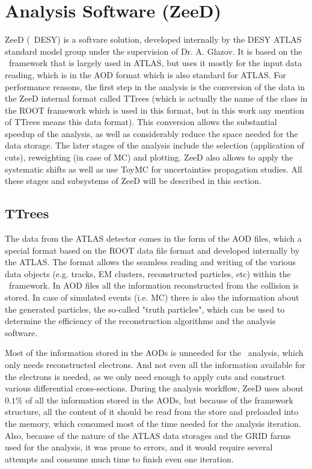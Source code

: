 \chapter{Analysis Software (ZeeD)}
\label{sec:ZeeD}
ZeeD (\Zee\ DESY) is a softvare solution, developed internally by the DESY ATLAS standard model group under the supervision of Dr. A. Glazov. It is based on the \Athena\ framework that is largely used in ATLAS, but uses it mostly for the input data reading, which is in the AOD format which is also standard for ATLAS. For performance reasons, the first step in the analysis is the conversion of the data in the ZeeD internal format called TTrees (which is actually the name of the class in the ROOT framework which is used in this format, but in this work any mention of TTrees means this data format). This conversion allows the substantial speedup of the analysis, as well as considerably reduce the space needed for the data storage. The later stages of the analysis include the selection (application of cuts), reweighting (in case of MC) and plotting. ZeeD also allows to apply the systematic shifts as well as use ToyMC for uncertainties propagation studies. All these stages and subsystems of ZeeD will be described in this section.

\section{TTrees}
\label{sec:ZeeD_TTrees}

The data from the ATLAS detector comes in the form of the AOD files, which a special format based on the ROOT data file format and developed internally by the ATLAS. The format allows the seamless reading and writing of the various data objects (e.g. tracks, EM clusters, reconstructed particles, etc) within the \Athena\ framework. In AOD files all the information reconstructed from the collision is stored. In case of simulated events (i.e. MC) there is also the information about the generated particles, the so-called "truth particles", which can be used to determine the efficiency of the reconstruction algorithms and the analysis software.

Most of the information stored in the AODs is unneeded for the \Zee\ analysis, which only needs reconstructed electrons. And not even all the information available for the electrons is needed, as we only need enough to apply cuts and construct various differential cross-sections. During the analysis workflow, ZeeD uses about $0.1\%$ of all the information stored in the AODs, but because of the framework structure, all the content of it should be read from the store and preloaded into the memory, which consumed most of the time needed for the analysis iteration. Also, because of the nature of the ATLAS data storages and the GRID farms used for the analysis, it was prone to errors, and it would require several attempts and consume much time to finish even one iteration.

